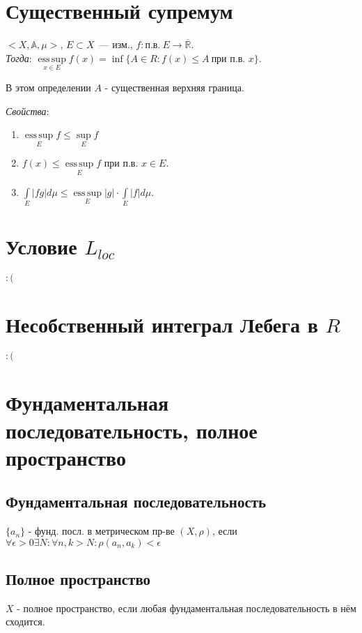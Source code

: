 \documentclass[paper=a4, fontsize=14pt]{report}
\DeclareMathOperator*{\esssup}{ess\, sup}
\begin{document}
\section{Существенный супремум}
$<X, \mathds{A}, \mu>$, $E \subset X$~--- изм., $f : \text{п.в.}\ E \rightarrow \overline{\mathbb{R}}$.\\

\emph{Тогда}: $\esssup\limits_{x \in E} f(x) = \inf \{A \in R : f(x) \leq A\ \text{при п.в. $x$}\}$.

В этом определении $A$ - существенная верхняя граница.

\emph{Свойства}:
\begin{enumerate}
    \item
    $\esssup\limits_E f \leq \sup\limits_E f$

    \item
    $f(x) \leq \esssup\limits_E f$ при п.в. $x \in E$.

    \item
    $\int\limits_E |fg|d\mu \leq \esssup\limits_E |g| \cdot \int\limits_E |f|d\mu$.
\end{enumerate}

\section{Условие $ L_{loc} $}

$:($

\section{Несобственный интеграл Лебега в $ R $}

$:($

\section{Фундаментальная последовательность, полное пространство}
\subsection{Фундаментальная последовательность}
$\{a_n\}$ - фунд. посл. в метрическом пр-ве $(X, \rho)$, если $\forall \epsilon > 0 \exists N: \forall n, k > N: \rho(a_n, a_k) < \epsilon$

\subsection{Полное пространство}
$X$ - полное пространство, если любая фундаментальная последовательность в нём сходится.
\end{document}
